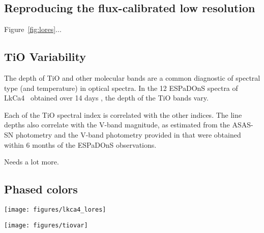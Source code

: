 \documentclass[onecolumn]{emulateapj}%
\newcommand{\name}{LkCa4 }
\begin{document}
\subsection{Reproducing the flux-calibrated low resolution}

Figure~\ref{fig:lores}...




\subsection{TiO Variability}

The depth of TiO and other molecular bands are a common diagnostic of spectral type (and temperature) in optical spectra.  In the 12 ESPaDOnS spectra of \name\ obtained over 14 days \citep{2014MNRAS.444.3220D}, the depth of the TiO bands vary.  


Each of the TiO spectral index is correlated with the other indices.  The line depths also correlate with the V-band magnitude, as estimated from the ASAS-SN photometry and the V-band photometry provided in \citep{2014MNRAS.444.3220D} that were obtained within 6 months of the ESPaDOnS observations.  

Needs a lot more.





\subsection{Phased colors}








\begin{figure*}
	\centering
	\texttt{[image: figures/lkca4\_lores]} 
	\vspace{-100mm}
	\caption{The low-resolution optical/near-IR spectrum of LkCa 4 is }
	\label{fig:lores}
\end{figure*}



\begin{figure*}
	\centering
	\texttt{[image: figures/tiovar]} 
	\vspace{-100mm}
	\caption{Variability in TiO bands measured with ESPaDOnS (see also Table X).  The V-band emission is estimated from fits to the ASAS-SN lightcurve obtained during the same period.  The main panel shows a correlation between V-band magnitude and the TiO-7140 index, while the inset shows a similar correlation with the average of the TiO 6200, CaH 6800, and TiO 7600 indices.}
	\label{fig:tiovar}
\end{figure*}
\end{document}
